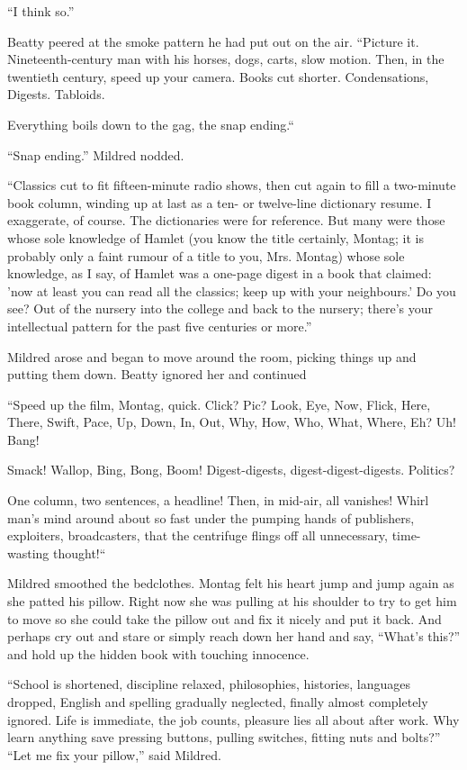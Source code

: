 \documentclass[11pt,openany]{book}
\begin{document}
``I think so.''

Beatty peered at the smoke pattern he had put out on the air. ``Picture it. Nineteenth-century man with his horses, dogs, carts, slow motion. Then, in the twentieth century, speed up your camera. Books cut shorter. Condensations, Digests. Tabloids.

Everything boils down to the gag, the snap ending.``

``Snap ending.'' Mildred nodded.

``Classics cut to fit fifteen-minute radio shows, then cut again to fill a two-minute book column, winding up at last as a ten- or twelve-line dictionary resume. I exaggerate, of course. The dictionaries were for reference. But many were those whose sole knowledge of Hamlet (you know the title certainly, Montag; it is probably only a faint rumour of a title to you, Mrs. Montag) whose sole knowledge, as I say, of Hamlet was a one-page digest in a book that claimed: 'now at least you can read all the classics; keep up with your neighbours.' Do you see? Out of the nursery into the college and back to the nursery; there's your intellectual pattern for the past five centuries or more.''

Mildred arose and began to move around the room, picking things up and putting them down. Beatty ignored her and continued

``Speed up the film, Montag, quick. Click? Pic? Look, Eye, Now, Flick, Here, There, Swift, Pace, Up, Down, In, Out, Why, How, Who, What, Where, Eh? Uh! Bang!

Smack! Wallop, Bing, Bong, Boom! Digest-digests, digest-digest-digests. Politics?

One column, two sentences, a headline! Then, in mid-air, all vanishes! Whirl man's mind around about so fast under the pumping hands of publishers, exploiters, broadcasters, that the centrifuge flings off all unnecessary, time-wasting thought!``

Mildred smoothed the bedclothes. Montag felt his heart jump and jump again as she patted his pillow. Right now she was pulling at his shoulder to try to get him to move so she could take the pillow out and fix it nicely and put it back. And perhaps cry out and stare or simply reach down her hand and say, ``What's this?'' and hold up the hidden book with touching innocence.

``School is shortened, discipline relaxed, philosophies, histories, languages dropped, English and spelling gradually neglected, finally almost completely ignored. Life is immediate, the job counts, pleasure lies all about after work. Why learn anything save pressing buttons, pulling switches, fitting nuts and bolts?'' ``Let me fix your pillow,'' said Mildred.
\end{document}

